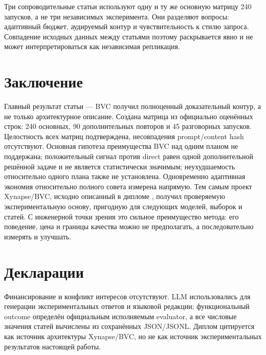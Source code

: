 \documentclass[11pt]{article}
\begin{document}
Три сопроводительные статьи используют одну и ту же основную матрицу
240 запусков, а не три независимых эксперимента. Они разделяют вопросы:
адаптивный бюджет, аудируемый контур и чувствительность к стилю запроса.
Совпадение исходных данных между статьями поэтому раскрывается явно и не
может интерпретироваться как независимая репликация.

\section{Заключение}

Главный результат статьи --- BVC получил полноценный доказательный контур, а
не только архитектурное описание. Создана матрица из \NAllRuns{} официально оценённых
строк: 240 основных, 90 дополнительных повторов и 45 разговорных запусков.
Целостность всех матриц подтверждена, несовпадения prompt/content hash
отсутствуют. Основная гипотеза преимущества BVC над одним планом не
поддержана; положительный сигнал против direct равен одной дополнительной
решённой задаче и не является статистически значимым; неухудшаемость
относительно одного плана также не установлена. Одновременно
адаптивная экономия относительно полного совета измерена напрямую.
Тем самым проект Xynapse/BVC, исходно описанный в дипломе
\cite{khalilov2026}, получил проверяемую экспериментальную основу, пригодную
для следующих моделей, выборок и статей. С инженерной точки зрения это сильное
преимущество метода: его поведение, цена и границы качества можно не
предполагать, а последовательно измерять и улучшать.

\section*{Декларации}

Финансирование и конфликт интересов отсутствуют. LLM использовались для
генерации экспериментальных ответов и языковой редакции; функциональный
outcome определён официальным исполняемым evaluator, а все числовые значения
статей вычислены из сохранённых JSON/JSONL. Диплом \cite{khalilov2026}
цитируется как источник архитектуры Xynapse/BVC, но не как источник
экспериментальных результатов настоящей работы.

\printbibliography[title={Литература}]
\end{document}
